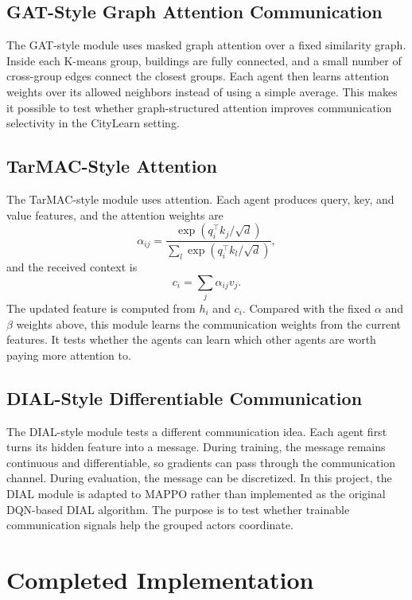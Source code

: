 \begin{itemize}
\subsection{GAT-Style Graph Attention Communication}

The GAT-style module uses masked graph attention over a fixed similarity graph.
Inside each K-means group, buildings are fully connected, and a small number of
cross-group edges connect the closest groups. Each agent then learns attention
weights over its allowed neighbors instead of using a simple average. This makes
it possible to test whether graph-structured attention improves communication
selectivity in the CityLearn setting.

\subsection{TarMAC-Style Attention}

The TarMAC-style module uses attention. Each agent produces query, key, and
value features, and the attention weights are
\[
\alpha_{ij} =
\frac{\exp(q_i^\top k_j / \sqrt{d})}
{\sum_l \exp(q_i^\top k_l / \sqrt{d})},
\]
and the received context is
\[
c_i = \sum_j \alpha_{ij}v_j .
\]
The updated feature is computed from $h_i$ and $c_i$. Compared with the fixed
$\alpha$ and $\beta$ weights above, this module learns the communication weights
from the current features. It tests whether the agents can learn which other
agents are worth paying more attention to.

\subsection{DIAL-Style Differentiable Communication}

The DIAL-style module tests a different communication idea. Each agent first
turns its hidden feature into a message. During training, the message remains
continuous and differentiable, so gradients can pass through the communication
channel. During evaluation, the message can be discretized. In this project, the
DIAL module is adapted to MAPPO rather than implemented as the original
DQN-based DIAL algorithm. The purpose is to test whether trainable
communication signals help the grouped actors coordinate.

\section{Completed Implementation}


\end{itemize}
